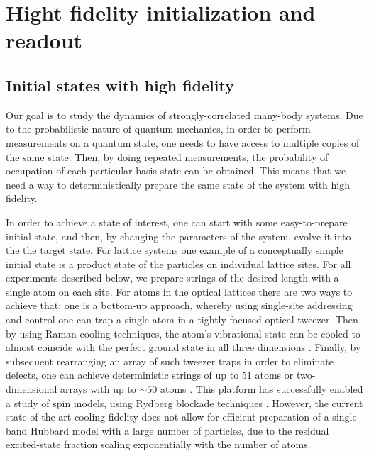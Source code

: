 \chapter{Hight fidelity initialization and readout}

\section{Initial states with high fidelity}

Our goal is to study the dynamics of strongly-correlated many-body systems. Due to the probabilistic nature of quantum mechanics, in order to perform measurements on a quantum state, one needs to have access to multiple copies of the same state. Then, by doing repeated measurements, the probability of occupation of each particular basis state can be obtained. This means that we need a way to deterministically prepare the same state of the system with high fidelity. 

In order to achieve a state of interest, one can start with some easy-to-prepare initial state, and then, by changing the parameters of the system, evolve it into the the target state. For lattice systems one example of a conceptually simple initial state is a product state of the particles on individual lattice sites. For all experiments described below, we prepare strings of the desired length with a single atom on each site. For atoms in the optical lattices there are two ways to achieve that: one is a bottom-up approach, whereby using single-site addressing and control one can trap a single atom in a tightly focused optical tweezer. Then by using Raman cooling techniques, the atom's vibrational state can be cooled to almost coincide with the perfect ground state in all three dimensions \cite{Kaufman2012, Thompson2013}. Finally, by subsequent rearranging an array of such tweezer traps in order to eliminate defects, one can achieve deterministic strings of up to 51 atoms \cite{Bernien2017} or two-dimensional arrays with up to $\sim50$ atoms \cite{Barredo2016}. This platform has successfully enabled a study of spin models, using Rydberg blockade techniques \cite{Bernien2017}. However, the current state-of-the-art cooling fidelity does not allow for efficient preparation of a single-band Hubbard model with a large number of particles, due to the residual excited-state fraction scaling exponentially with the number of atoms.

